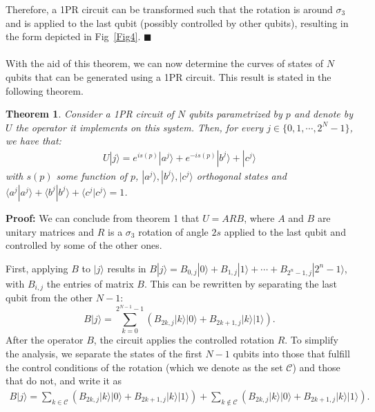 \documentclass[10pt,letterpaper]{article} %
\newcommand{\fref}[1]{Fig~\ref{#1}}
\newtheorem{theorem}{Theorem}
\begin{document}
Therefore, a 1PR circuit can be transformed such
that the rotation is around $\sigma_3$ and is applied to the last qubit 
(possibly controlled by other qubits), 
resulting in the form depicted in \fref{Fig4}. 
$\blacksquare$ \\
$\;$\\

With the aid of this theorem, we can now determine the curves
of states of $N$ qubits that can be generated using a 1PR circuit. 
This result is stated in the following theorem.

\begin{theorem}
\label{theorem2}
Consider a 1PR circuit of $N$ qubits parametrized by $p$
and denote by $U$ the operator it implements on this system. 
Then, for every $j \in \{0, 1, \cdots, 2^N-1\}$, 
we have that:
\begin{align*}
U|j\rangle = e^{is(p)} |a^j\rangle + e^{-is(p)} |b^j\rangle + |c^j\rangle
\end{align*}
with $s(p)$ some function of $p$,  $|a^j\rangle ,|b^j\rangle, |c^j\rangle$ orthogonal states  and $\langle a^j| a^j\rangle + \langle b^j| b^j\rangle + \langle
c^j|c^j \rangle = 1$.
\end{theorem}
\textbf{Proof:}  
We can conclude from theorem 1 that $U=ARB$,
where $A$ and $B$ are unitary matrices and $R$ is a $\sigma_3$ rotation of angle $2s$
applied to the last qubit and controlled by some of the other ones. 

First, applying $B$ to $|j\rangle$ results in $B|j\rangle = B_{0,j} |0\rangle + B_{1,j} |1 \rangle + \cdots + B_{2^n-1,j}|2^n-1\rangle$,
with $B_{i,j}$ the entries of matrix $B$.
This can be rewritten by separating the last qubit from the other $N-1$:
\begin{equation}
B|j\rangle = \sum_{k=0}^{2^{N-1}-1} \left( B_{2k,j} |k\rangle|0\rangle  + B_{2k+1,j} |k \rangle |1\rangle  \right).
\end{equation}
After the operator $B$, the circuit applies the  controlled rotation $R$.
To simplify the analysis, we separate the states of
the first $N-1$ qubits into those that fulfill the control conditions of the rotation
(which we denote as the set $\mathcal{C}$)
and those that do not, and write it as
\begin{align}
B|j\rangle = 
   \sum_{k \in \mathcal{C}} \left( B_{2k,j} |k\rangle|0\rangle 
                                     + B_{2k+1,j} |k \rangle |1\rangle  \right) 
   + \sum_{k \not\in \mathcal{C}} \left( B_{2k,j} |k\rangle|0\rangle  
                                      + B_{2k+1,j} |k \rangle |1\rangle  \right).
\end{align}
\end{document}

